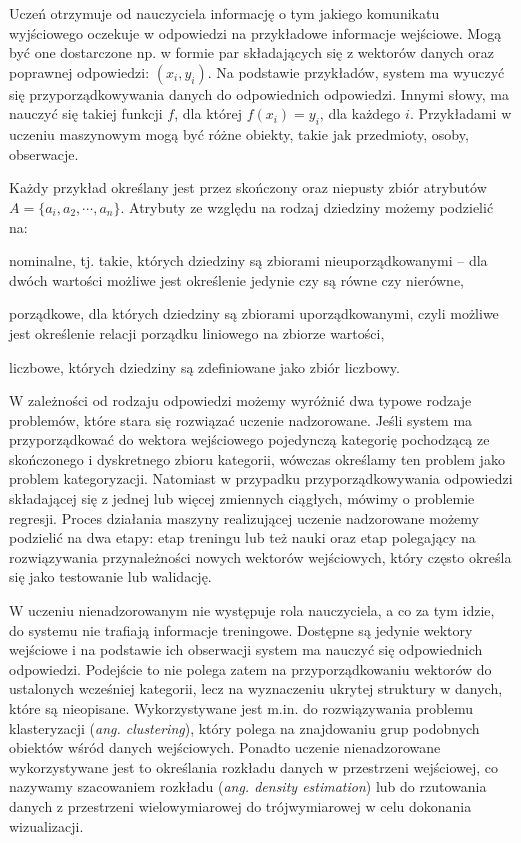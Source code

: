 Uczeń otrzymuje od nauczyciela informację o tym jakiego komunikatu wyjściowego oczekuje w odpowiedzi na przykładowe informacje wejściowe. Mogą być one dostarczone np. w formie par składających się z wektorów danych oraz poprawnej odpowiedzi: $(x_{i}, y_{i})$. Na podstawie przykładów, system ma wyuczyć się przyporządkowywania danych do odpowiednich odpowiedzi. Innymi słowy, ma nauczyć się takiej funkcji $f$, dla której $f(x_{i})=y_{i}$, dla każdego $i$. Przykładami w uczeniu maszynowym mogą być różne obiekty, takie jak przedmioty, osoby, obserwacje.

Każdy przykład określany jest przez skończony oraz niepusty zbiór atrybutów $A=\lbrace a_{i}, a_{2}, \cdots, a_{n}\rbrace$. Atrybuty ze względu na rodzaj dziedziny możemy podzielić na: 
\begin{compactitem}
	\item nominalne, tj. takie, których dziedziny są zbiorami nieuporządkowanymi -- dla dwóch wartości możliwe jest określenie jedynie czy są równe czy nierówne,
	\item porządkowe, dla których dziedziny są zbiorami uporządkowanymi, czyli możliwe jest określenie relacji porządku liniowego na zbiorze wartości,
	\item liczbowe, których dziedziny są zdefiniowane jako zbiór liczbowy.
\end{compactitem}

W zależności od rodzaju odpowiedzi możemy wyróżnić dwa typowe rodzaje problemów, które stara się rozwiązać uczenie nadzorowane. Jeśli system ma przyporządkować do wektora wejściowego pojedynczą kategorię pochodzącą ze skończonego i dyskretnego zbioru kategorii, wówczas określamy ten problem jako problem kategoryzacji. Natomiast w przypadku przyporządkowywania odpowiedzi składającej się z jednej lub więcej zmiennych ciągłych, mówimy o problemie regresji.\cite{BISHOP06} Proces działania maszyny realizującej uczenie nadzorowane możemy podzielić na dwa etapy: etap treningu lub też nauki oraz etap polegający na rozwiązywania przynależności nowych wektorów wejściowych, który często określa się jako testowanie lub walidację.

W uczeniu nienadzorowanym nie występuje rola nauczyciela, a co za tym idzie, do systemu nie trafiają informacje treningowe. Dostępne są jedynie wektory wejściowe i na podstawie ich obserwacji system ma nauczyć się odpowiednich odpowiedzi.\cite{CICHOSZ00} Podejście to nie polega zatem na przyporządkowaniu wektorów do ustalonych wcześniej kategorii, lecz na wyznaczeniu ukrytej struktury w danych, które są nieopisane.\cite{VALPOLA} Wykorzystywane jest m.in. do rozwiązywania problemu klasteryzacji (\emph{ang. clustering}), który polega na znajdowaniu grup podobnych obiektów wśród danych wejściowych. Ponadto uczenie nienadzorowane wykorzystywane jest to określania rozkładu danych w przestrzeni wejściowej, co nazywamy szacowaniem rozkładu (\emph{ang. density estimation}) lub do rzutowania danych z przestrzeni wielowymiarowej do trójwymiarowej w celu dokonania wizualizacji.\cite{BISHOP06}

